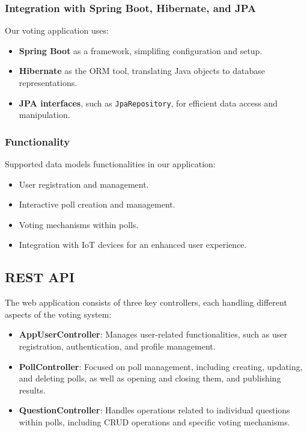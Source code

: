 \subsubsection{Integration with Spring Boot, Hibernate, and JPA}
Our voting application uses:

\begin{itemize}
    \item \textbf{Spring Boot} as a framework, simplifing configuration and setup.
    \item \textbf{Hibernate} as the ORM tool, translating Java objects to database representations.
    \item \textbf{JPA interfaces}, such as \texttt{JpaRepository}, for efficient data access and manipulation.
\end{itemize}

\subsubsection{Functionality}

Supported data models functionalities in our application:
\begin{itemize}
    \item User registration and management.
    \item Interactive poll creation and management.
    \item Voting mechanisms within polls.
    \item Integration with IoT devices for an enhanced user experience.
\end{itemize}

\subsection{REST API}
The web application consists of three key controllers, each handling different aspects of the voting system:

\begin{itemize}
    \item \textbf{AppUserController}: Manages user-related functionalities, such as user registration, authentication, and profile management.
    \item \textbf{PollController}: Focused on poll management, including creating, updating, and deleting polls, as well as opening and closing them, and publishing results.
    \item \textbf{QuestionController}: Handles operations related to individual questions within polls, including CRUD operations and specific voting mechanisms.
\end{itemize}

